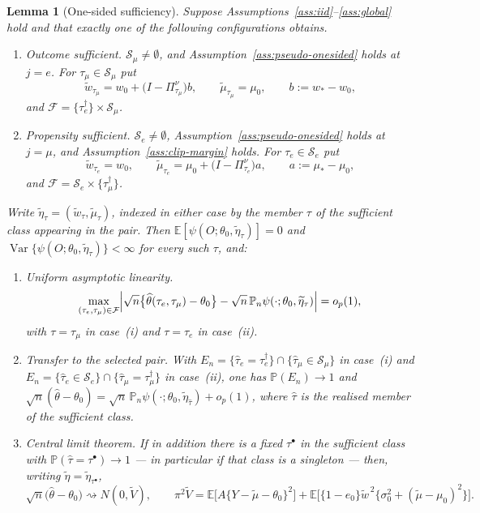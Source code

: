 \documentclass[11pt]{article}
\theoremstyle{plain}
\newtheorem{lemma}[theorem]{Lemma}
\theoremstyle{definition}
\theoremstyle{remark}
\newcommand{\E}{\mathbb{E}}
\newcommand{\PP}{\mathbb{P}}
\newcommand{\Pn}{\mathbb{P}_n}
\newcommand{\cS}{\mathcal{S}}
\newcommand{\ez}{e_0}
\newcommand{\mz}{\mu_0}
\newcommand{\wz}{w_0}
\newcommand{\that}{\widehat{\tau}}
\newcommand{\thetahat}{\widehat{\theta}}
\DeclareMathOperator{\Var}{Var}
\newcommand{\etatil}{\widetilde{\eta}}
\newcommand{\wtil}{\widetilde{w}}
\newcommand{\mtil}{\widetilde{\mu}}
\newcommand{\Vtil}{\widetilde{V}}
\newcommand{\cF}{\mathcal{F}}
\begin{document}
\begin{lemma}[One-sided sufficiency]\label{lem:onesided}
Suppose Assumptions~\ref{ass:iid}--\ref{ass:global} hold and that exactly one of
the following configurations obtains.
\begin{enumerate}[label=(\roman*),nosep]
  \item \emph{Outcome sufficient.} $\cS_\mu\ne\emptyset$, and
  Assumption~\ref{ass:pseudo-onesided} holds at $j=e$. For
  $\tau_\mu\in\cS_\mu$ put
  \[
    \wtil_{\tau_\mu}=\wz+\bigl(I-\Pi^\nu_{\tau_\mu}\bigr)b,\qquad
    \mtil_{\tau_\mu}=\mz,\qquad b:=w_*-\wz,
  \]
  and $\cF=\{\tau^\dagger_e\}\times\cS_\mu$.
  \item \emph{Propensity sufficient.} $\cS_e\ne\emptyset$,
  Assumption~\ref{ass:pseudo-onesided} holds at $j=\mu$, and
  Assumption~\ref{ass:clip-margin} holds. For $\tau_e\in\cS_e$ put
  \[
    \wtil_{\tau_e}=\wz,\qquad
    \mtil_{\tau_e}=\mz+\bigl(I-\Pi^\nu_{\tau_e}\bigr)a,\qquad a:=\mu_*-\mz,
  \]
  and $\cF=\cS_e\times\{\tau^\dagger_\mu\}$.
\end{enumerate}
Write $\etatil_\tau=(\wtil_\tau,\mtil_\tau)$, indexed in either case by the
member $\tau$ of the sufficient class appearing in the pair. Then
$\E[\psi(O;\theta_0,\etatil_\tau)]=0$ and
$\Var\{\psi(O;\theta_0,\etatil_\tau)\}<\infty$ for every such $\tau$, and:
\begin{enumerate}[label=(\alph*),nosep]
  \item \emph{Uniform asymptotic linearity.}
  \[
    \max_{(\tau_e,\tau_\mu)\in\cF}
    \Bigl\lvert\sqrt n\bigl\{\thetahat(\tau_e,\tau_\mu)-\theta_0\bigr\}
     -\sqrt n\,\Pn\psi(\cdot;\theta_0,\etatil_\tau)\Bigr\rvert=o_p(1),
  \]
  with $\tau=\tau_\mu$ in case~(i) and $\tau=\tau_e$ in case~(ii).
  \item \emph{Transfer to the selected pair.} With
  $E_n=\{\that_e=\tau^\dagger_e\}\cap\{\that_\mu\in\cS_\mu\}$ in case~(i) and
  $E_n=\{\that_e\in\cS_e\}\cap\{\that_\mu=\tau^\dagger_\mu\}$ in case~(ii), one
  has $\PP(E_n)\to1$ and
  $\sqrt n(\thetahat-\theta_0)=\sqrt n\,\Pn\psi(\cdot;\theta_0,\etatil_{\that})
  +o_p(1)$, where $\that$ is the realised member of the sufficient class.
  \item \emph{Central limit theorem.} If in addition there is a fixed
  $\tau^\bullet$ in the sufficient class with $\PP(\that=\tau^\bullet)\to1$ ---
  in particular if that class is a singleton --- then, writing
  $\etatil=\etatil_{\tau^\bullet}$,
  \[
    \sqrt n\bigl(\thetahat-\theta_0\bigr)\rightsquigarrow N(0,\Vtil),
    \qquad
    \pi^2\Vtil=\E\bigl[A\{Y-\mtil-\theta_0\}^2\bigr]
     +\E\bigl[\{1-\ez\}\wtil^{\,2}
      \bigl\{\sigma_0^2+(\mtil-\mz)^2\bigr\}\bigr].
  \]
\end{enumerate}
\end{lemma}
\end{document}
